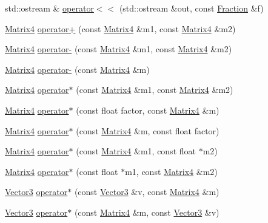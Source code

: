 \begin{DoxyCompactItemize}
std\+::ostream \& \hyperlink{namespaceprism_a9c2d182a77a92e6cba7917dbd58f9d87}{operator$<$$<$} (std\+::ostream \&out, const \hyperlink{classprism_1_1_fraction}{Fraction} \&f)
\item 
\hyperlink{classprism_1_1_matrix4}{Matrix4} \hyperlink{namespaceprism_a33537d30f01f996f8a05fc5b1b49ba3b}{operator+} (const \hyperlink{classprism_1_1_matrix4}{Matrix4} \&m1, const \hyperlink{classprism_1_1_matrix4}{Matrix4} \&m2)
\item 
\hyperlink{classprism_1_1_matrix4}{Matrix4} \hyperlink{namespaceprism_a34a2f64f209065f753bed62a880b75b6}{operator-\/} (const \hyperlink{classprism_1_1_matrix4}{Matrix4} \&m1, const \hyperlink{classprism_1_1_matrix4}{Matrix4} \&m2)
\item 
\hyperlink{classprism_1_1_matrix4}{Matrix4} \hyperlink{namespaceprism_a879d3410d690b5722a9af17297f38fbb}{operator-\/} (const \hyperlink{classprism_1_1_matrix4}{Matrix4} \&m)
\item 
\hyperlink{classprism_1_1_matrix4}{Matrix4} \hyperlink{namespaceprism_a9ae44fb46bb709a5c8f4d592baf65522}{operator$\ast$} (const \hyperlink{classprism_1_1_matrix4}{Matrix4} \&m1, const \hyperlink{classprism_1_1_matrix4}{Matrix4} \&m2)
\item 
\hyperlink{classprism_1_1_matrix4}{Matrix4} \hyperlink{namespaceprism_ab3639f7bd46a54726522dfe406841ea9}{operator$\ast$} (const float factor, const \hyperlink{classprism_1_1_matrix4}{Matrix4} \&m)
\item 
\hyperlink{classprism_1_1_matrix4}{Matrix4} \hyperlink{namespaceprism_a4073983f089695c40b6fd20d892175f9}{operator$\ast$} (const \hyperlink{classprism_1_1_matrix4}{Matrix4} \&m, const float factor)
\item 
\hyperlink{classprism_1_1_matrix4}{Matrix4} \hyperlink{namespaceprism_aa2859acb8e8dd6fea8678e14249e561d}{operator$\ast$} (const \hyperlink{classprism_1_1_matrix4}{Matrix4} \&m1, const float $\ast$m2)
\item 
\hyperlink{classprism_1_1_matrix4}{Matrix4} \hyperlink{namespaceprism_a5e83bcd69595728106bed838aeb32f70}{operator$\ast$} (const float $\ast$m1, const \hyperlink{classprism_1_1_matrix4}{Matrix4} \&m2)
\item 
\hyperlink{classprism_1_1_vector3}{Vector3} \hyperlink{namespaceprism_a95ceb3342a808c88d0bb7c1f7e0ef82b}{operator$\ast$} (const \hyperlink{classprism_1_1_vector3}{Vector3} \&v, const \hyperlink{classprism_1_1_matrix4}{Matrix4} \&m)
\item 
\hyperlink{classprism_1_1_vector3}{Vector3} \hyperlink{namespaceprism_a04f1e6e0f84169fce23b236e0312d6a0}{operator$\ast$} (const \hyperlink{classprism_1_1_matrix4}{Matrix4} \&m, const \hyperlink{classprism_1_1_vector3}{Vector3} \&v)

\end{DoxyCompactItemize}
